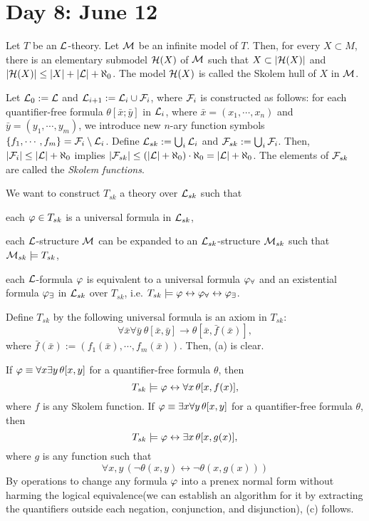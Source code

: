 \documentclass{../../../small}
\begin{document}
\newpage
\section{Day 8: June 12}

\begin{thm*}
Let $T$ be an $\mathcal{L}$-theory.
Let $\mathcal{M}$ be an infinite model of $T$.
Then, for every $X\subset M$, there is an elementary submodel $\mathcal{H}(X)$ of $\mathcal{M}$ such that $X\subset|\mathcal{H}(X)|$ and $|\mathcal{H}(X)|\le|X|+|\mathcal{L}|+\aleph_0$.
The model $\mathcal{H}(X)$ is called the Skolem hull of $X$ in $\mathcal{M}$.
\end{thm*}
\begin{pf}
Let $\mathcal{L}_0:=\mathcal{L}$ and $\mathcal{L}_{i+1}:=\mathcal{L}_i\cup\mathcal{F}_i$, where $\mathcal{F}_i$ is constructed as follows:
for each quantifier-free formula $\theta[\bar x;\bar y]$ in $\mathcal{L}_i$, where $\bar x=(x_1,\cdots,x_n)$ and $\bar y=(y_1,\cdots,y_m)$, we introduce new $n$-ary function symbols $\{f_1,\cdots,f_m\}=\mathcal{F}_i\setminus\mathcal{L}_i$.
Define $\mathcal{L}_{sk}:=\bigcup_i\mathcal{L}_i$ and $\mathcal{F}_{sk}:=\bigcup_i\mathcal{F}_i$.
Then, $|\mathcal{F}_i|\le|\mathcal{L}|+\aleph_0$ implies $|\mathcal{F}_{sk}|\le(|\mathcal{L}|+\aleph_0)\cdot\aleph_0=|\mathcal{L}|+\aleph_0$.
The elements of $\mathcal{F}_{sk}$ are called the \emph{Skolem functions}.

We want to construct $T_{sk}$ a theory over $\mathcal{L}_{sk}$ such that
\begin{parts}
\item each $\varphi\in T_{sk}$ is a universal formula in $\mathcal{L}_{sk}$,
\item each $\mathcal{L}$-structure $\mathcal{M}$ can be expanded to an $\mathcal{L}_{sk}$-structure $\mathcal{M}_{sk}$ such that $\mathcal{M}_{sk}\models T_{sk}$,
\item each $\mathcal{L}$-formula $\varphi$ is equivalent to a universal formula $\varphi_\forall$ and an existential formula $\varphi_\exists$ in $\mathcal{L}_{sk}$ over $T_{sk}$, i.e. $T_{sk}\models\varphi\leftrightarrow\varphi_\forall\leftrightarrow\varphi_\exists$.
\end{parts}
Define $T_{sk}$ by the following universal formula is an axiom in $T_{sk}$:
\[\forall\bar x\forall\bar y\ \theta[\bar x,\bar y]\to\theta[\bar x,\bar f(\bar x)],\]
where $\bar f(\bar x):=(f_1(\bar x),\cdots,f_m(\bar x))$.
Then, (a) is clear.


If $\varphi\equiv\forall x\exists y\,\theta[x,y]$ for a quantifier-free formula $\theta$, then
\[T_{sk}\models\varphi\leftrightarrow\forall x\,\theta[x,f(x)],\]
where $f$ is any Skolem function.
If $\varphi\equiv\exists x\forall y\,\theta[x,y]$ for a quantifier-free formula $\theta$, then
\[T_{sk}\models\varphi\leftrightarrow\exists x\,\theta[x,g(x)],\] where $g$ is any function such that
\[\forall x,y\,(\neg\theta(x,y)\leftrightarrow\neg\theta(x,g(x)))\]
By operations to change any formula $\varphi$ into a prenex normal form without harming the logical equivalence(we can establish an algorithm for it by extracting the quantifiers outside each negation, conjunction, and disjunction), (c) follows.


\end{pf}
\end{document}
